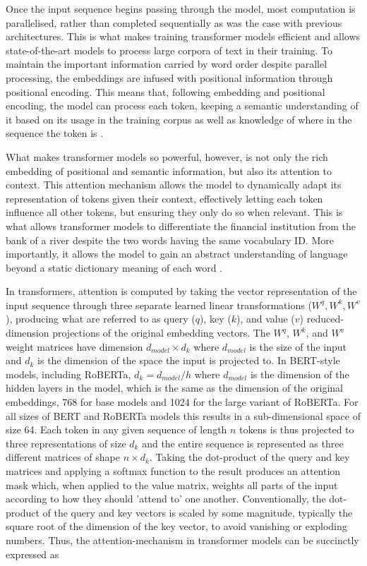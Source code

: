 \documentclass[12pt]{report}
\begin{document}
Once the input sequence begins passing through the model, most computation is parallelised, rather than completed sequentially as was the case with previous architectures.
This is what makes training transformer models efficient and allows state-of-the-art models to process large corpora of text in their training.
To maintain the important information carried by word order despite parallel processing, the embeddings are infused with positional information through positional encoding.
This means that, following embedding and positional encoding, the model can process each token, keeping a semantic understanding of it based on its usage in the training corpus as well as knowledge of where in the sequence the token is \cite{Vaswani2017}.

What makes transformer models so powerful, however, is not only the rich embedding of positional and semantic information, but also its attention to context.
This attention mechanism allows the model to dynamically adapt its representation of tokens given their context, effectively letting each token influence all other tokens, but ensuring they only do so when relevant.
This is what allows transformer models to differentiate the financial institution from the bank of a river despite the two words having the same vocabulary ID.
More importantly, it allows the model to gain an abstract understanding of language beyond a static dictionary meaning of each word \cite{Vaswani2017}.

In transformers, attention is computed by taking the vector representation of the input sequence through three separate learned linear transformations ($W^q, W^k, W^v$), producing what are referred to as query ($q$), key ($k$), and value ($v$) reduced-dimension projections of the original embedding vectors.
The $W^q$, $W^k$, and $W^v$ weight matrices have dimension $d_{model} \times d_k$ where $d_{model}$ is the size of the input and $d_k$ is the dimension of the space the input is projected to.
In BERT-style models, including RoBERTa, $d_k = d_{model}/h$ where $d_{model}$ is the dimension of the hidden layers in the model, which is the same as the dimension of the original embeddings, 768 for base models and 1024 for the large variant of RoBERTa.
For all sizes of BERT and RoBERTa models this results in a sub-dimensional space of size 64.
Each token in any given sequence of length $n$ tokens is thus projected to three representations of size $d_k$ and the entire sequence is represented as three different matrices of shape $n \times d_k$.
Taking the dot-product of the query and key matrices and applying a softmax function to the result produces an attention mask which, when applied to the value matrix, weights all parts of the input according to how they should 'attend to' one another.
Conventionally, the dot-product of the query and key vectors is scaled by some magnitude, typically the square root of the dimension of the key vector, to avoid vanishing or exploding numbers.
Thus, the attention-mechanism in transformer models can be succinctly expressed as
\end{document}
